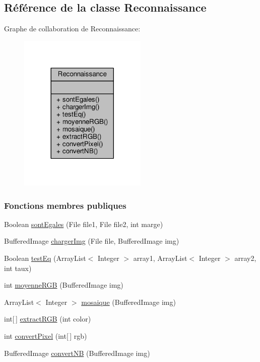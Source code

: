 \hypertarget{classReconnaissance}{}\subsection{Référence de la classe Reconnaissance}
\label{classReconnaissance}


Graphe de collaboration de Reconnaissance\+:\nopagebreak
\begin{figure}[H]
\begin{center}
\leavevmode
\includegraphics[width=173pt]{classReconnaissance__coll__graph}
\end{center}
\end{figure}
\subsubsection*{Fonctions membres publiques}
\begin{DoxyCompactItemize}
\item 
Boolean \hyperlink{classReconnaissance_a8ab284fbc58faede165312fb61ce1b1f}{sont\+Egales} (File file1, File file2, int marge)
\item 
Buffered\+Image \hyperlink{classReconnaissance_a3d776850688751d4c79d789e6128274a}{charger\+Img} (File file, Buffered\+Image img)
\item 
Boolean \hyperlink{classReconnaissance_ab2638900b05e6831d146fe735b68e34e}{test\+Eq} (Array\+List$<$ Integer $>$ array1, Array\+List$<$ Integer $>$ array2, int taux)
\item 
int \hyperlink{classReconnaissance_a4688f68bfff28449d6ebcbd227e0c105}{moyenne\+R\+G\+B} (Buffered\+Image img)
\item 
Array\+List$<$ Integer $>$ \hyperlink{classReconnaissance_a5fa55ce653840c741fda6db53b49c531}{mosaique} (Buffered\+Image img)
\item 
int\mbox{[}$\,$\mbox{]} \hyperlink{classReconnaissance_aea55d6d58f99fdca8288627c84ee41db}{extract\+R\+G\+B} (int color)
\item 
int \hyperlink{classReconnaissance_ae4d81d2584c13e1a646b74665e69139a}{convert\+Pixel} (int\mbox{[}$\,$\mbox{]} rgb)
\item 
Buffered\+Image \hyperlink{classReconnaissance_a0eaf76e3e150c8f477ed45325fcf5475}{convert\+N\+B} (Buffered\+Image img)
\end{DoxyCompactItemize}


